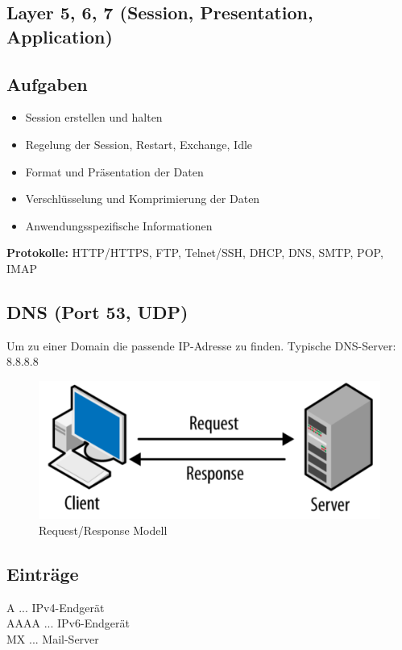 \subsection{Layer 5, 6, 7 (Session, Presentation, Application)}
\subsection*{Aufgaben}
\begin{itemize}
	\item Session erstellen und halten
	\item Regelung der Session, Restart, Exchange, Idle
	\item Format und Präsentation der Daten
	\item Verschlüsselung und Komprimierung der Daten
	\item Anwendungsspezifische Informationen
\end{itemize}
\textbf{Protokolle:} HTTP/HTTPS, FTP, Telnet/SSH, DHCP, DNS, SMTP, POP, IMAP

\subsection*{DNS (Port 53, UDP)}
Um zu einer Domain die passende IP-Adresse zu finden.
Typische DNS-Server: 8.8.8.8

\begin{figure}[H]
	\centering
	\includegraphics[width=0.8\linewidth]{figures/request_response.png}
	\caption{Request/Response Modell}
\end{figure}

\subsection*{Einträge}
A ... IPv4-Endgerät \\
AAAA ... IPv6-Endgerät \\
MX ... Mail-Server

